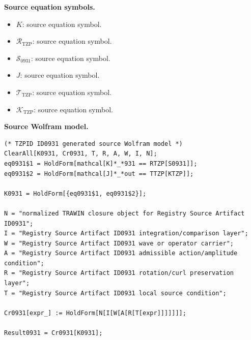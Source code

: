 \begin{minipage}[t]{0.49\linewidth}
\begingroup
\small
\raggedright
\textbf{Source equation symbols.}\par
\begin{itemize}[leftmargin=1.35em,itemsep=1pt,topsep=1pt,parsep=0pt]
    \item $K$: source equation symbol.
    \item $\mathcal{R}_{\mathrm{TZP}}$: source equation symbol.
    \item $\mathcal{S}_{0931}$: source equation symbol.
    \item $J$: source equation symbol.
    \item $\mathcal{T}_{\mathrm{TZP}}$: source equation symbol.
    \item $\mathcal{K}_{\mathrm{TZP}}$: source equation symbol.
\end{itemize}
\endgroup
\end{minipage}\hfill
\begin{minipage}[t]{0.47\linewidth}
\begingroup
\scriptsize
\raggedright
\textbf{Source Wolfram model.}\par
\begin{Verbatim}[fontsize=\tiny,breaklines=true,breakanywhere=true]
(* TZPID ID0931 generated source Wolfram model *)
ClearAll[K0931, Cr0931, T, R, A, W, I, N];
eq0931$1 = HoldForm[mathcal[K]*_*931 == RTZP[S0931]];
eq0931$2 = HoldForm[mathcal[J]*_*out == TTZP[KTZP]];

K0931 = HoldForm[{eq0931$1, eq0931$2}];

N = "normalized TRAWIN closure object for Registry Source Artifact ID0931";
I = "Registry Source Artifact ID0931 integration/comparison layer";
W = "Registry Source Artifact ID0931 wave or operator carrier";
A = "Registry Source Artifact ID0931 admissible action/amplitude condition";
R = "Registry Source Artifact ID0931 rotation/curl preservation layer";
T = "Registry Source Artifact ID0931 local source condition";

Cr0931[expr_] := HoldForm[N[I[W[A[R[T[expr]]]]]]];

Result0931 = Cr0931[K0931];
\end{Verbatim}
\endgroup
\end{minipage}

